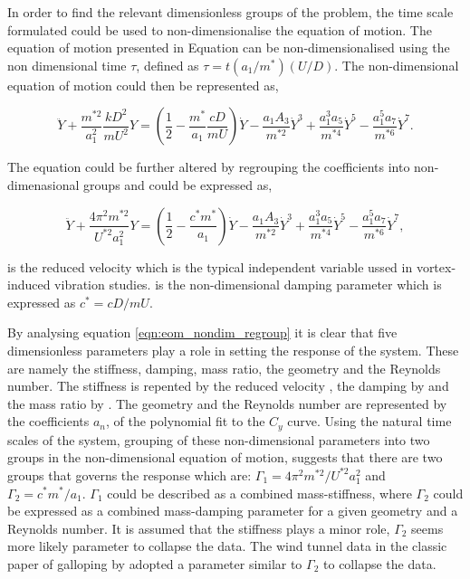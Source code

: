 In order to find the relevant dimensionless groups of the problem, the time scale formulated could be used to non-dimensionalise the equation of motion. The equation of motion presented in Equation  can be non-dimensionalised using the non dimensional time $\tau$, defined as $\tau=t(a_1/m^*)(U/D)$. The non-dimensional equation of motion could then be represented as, 

 \begin{equation}
 \label{eqn:eom_nondim}
 \ddot{Y} + \frac{m^{*2}}{a_1^2}\frac{kD^2}{mU^2}Y = \left(\frac{1}{2} - \frac{m^*}{a_1}\frac{cD}{mU}\right)\dot{Y} - \frac{a_1A_3}{m^{*2}}\dot{Y}^3 + \frac{a_1^3a_5}{m^{*4}}\dot{Y}^5 - \frac{a_1^5a_7}{m^{*6}}\dot{Y}^7.
 \end{equation}
 
 The equation could be further altered by regrouping the coefficients into non-dimenasional groups and could be expressed as, 
 
  \begin{equation}
  \label{eqn:eom_nondim_regroup}
  \ddot{Y} + \frac{4\pi^{2}m^{*2}}{U^{*2}a_1^2}Y = \left(\frac{1}{2} - \frac{c^*m^*}{a_1}\right)\dot{Y} - \frac{a_1A_3}{m^{*2}}\dot{Y}^3 + \frac{a_1^3a_5}{m^{*4}}\dot{Y}^5 - \frac{a_1^5a_7}{m^{*6}}\dot{Y}^7,
  \end{equation}  

\ustar is the reduced velocity which is the typical independent variable ussed in vortex-induced vibration studies. \cstar is the non-dimensional damping parameter which is expressed as $c^*=cD/mU$. 

By analysing equation \ref{eqn:eom_nondim_regroup} it is clear that five dimensionless parameters play a role in setting the response of the system. These are namely the stiffness, damping, mass ratio, the geometry and the Reynolds number. The stiffness is repented by the reduced velocity \ustar, the damping by \cstar and the mass ratio by \mstar. The geometry and the Reynolds number are represented by the coefficients $a_n$, of the polynomial fit to the $C_y$ curve. Using the natural time scales of the system, grouping of these non-dimensional parameters into two groups in the non-dimensional equation of motion, suggests that there are two groups that governs the response which are: $\Gamma_1 = 4\pi^2m^{*2}/U^{*2}a_1^2$ and $\Gamma_2 = c^*m^*/a_1$. $\Gamma_1$ could be described as a combined mass-stiffness, where $\Gamma_2$ could be expressed as a combined mass-damping parameter for a given geometry and a Reynolds number. It is assumed that the stiffness plays a minor role, $\Gamma_2$ seems more likely parameter to collapse the data. The wind tunnel data in the classic paper of galloping by \citep{Parkinson1964} adopted a parameter similar to $\Gamma_2$ to collapse the data. 

